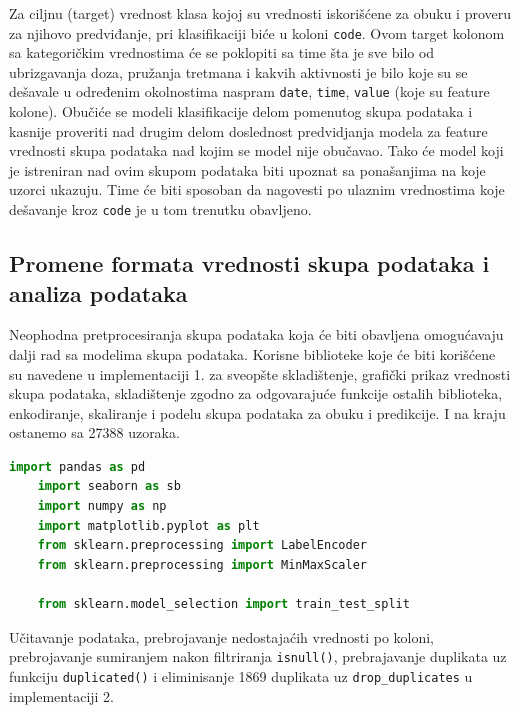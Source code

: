 \documentclass[fontsize=12bp, paper=a4]{scrarticle}
\begin{document}
Za ciljnu (target) vrednost klasa kojoj su vrednosti iskorišćene za obuku i proveru za njihovo predviđanje, pri klasifikaciji biće u koloni \verb|code|. Ovom target kolonom sa kategoričkim vrednostima će se poklopiti sa time šta je sve bilo od ubrizgavanja doza, pružanja tretmana i kakvih aktivnosti je bilo koje su se dešavale u određenim okolnostima naspram \verb|date|, \verb|time|, \verb|value| (koje su feature kolone). Obučiće se modeli klasifikacije delom pomenutog skupa podataka i kasnije proveriti nad drugim delom doslednost predvidjanja modela za feature vrednosti skupa podataka nad kojim se model nije obučavao. Tako će model koji je istreniran nad ovim skupom podataka biti upoznat sa ponašanjima na koje uzorci ukazuju. Time će biti sposoban da nagovesti po ulaznim vrednostima koje dešavanje kroz \verb|code| je u tom trenutku obavljeno.
\subsection{Promene formata vrednosti skupa podataka i analiza podataka}

Neophodna pretprocesiranja skupa podataka koja će biti obavljena omogućavaju dalji rad sa modelima skupa podataka. Korisne biblioteke koje će biti korišćene su navedene u implementaciji 1. za sveopšte skladištenje\cite{pd}, grafički prikaz vrednosti skupa podataka\cite{sb}\cite{plt}, skladištenje zgodno za odgovarajuće funkcije ostalih biblioteka\cite{np}, enkodiranje\cite{le}, skaliranje\cite{ms} i podelu skupa podataka za obuku i predikcije\cite{tts}. I na kraju ostanemo sa 27388 uzoraka.

\begin{lstlisting}[language=Python, caption={\centering Navođenje biblioteka koje su korisne pri pretprocesiranju}]
    import pandas as pd
    import seaborn as sb
    import numpy as np
    import matplotlib.pyplot as plt
    from sklearn.preprocessing import LabelEncoder
    from sklearn.preprocessing import MinMaxScaler
    
    from sklearn.model_selection import train_test_split
\end{lstlisting}

Učitavanje podataka, prebrojavanje nedostajaćih vrednosti po koloni, prebrojavanje sumiranjem nakon filtriranja \verb|isnull()|, prebrajavanje duplikata uz funkciju \verb|duplicated()| i eliminisanje 1869 duplikata uz \verb|drop_duplicates| u implementaciji 2.
\end{document}
